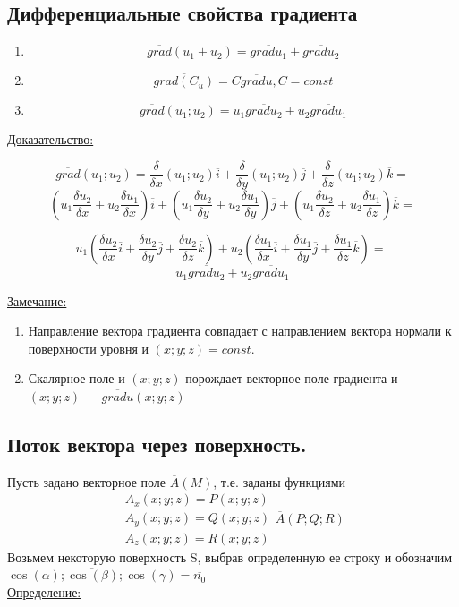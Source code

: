 \documentclass[12pt]{article}
\begin{document}
  \subsection*{Дифференциальные свойства градиента}
  \begin{enumerate}
    \item \[\overline{grad}(u_1+u_2)=\overline{grad u_1}+\overline{grad u_2}\]
    \item \[\overline{grad(C_u)}=C\overline{grad u}, C=const\]
    \item \[\overline{grad}(u_1;u_2)=u_1\overline{grad u_2}+u_2\overline{grad u_1}\]
  \end{enumerate}
  \underline{Доказательство:}
  \begin{adjustwidth}{1.5em}{1.5em}
    \[\overline{grad}(u_1;u_2)=
    \frac{\delta}{\delta x}(u_1;u_2)\overline{i}+\frac{\delta}{\delta y}(u_1;u_2)\overline{j}+\frac{\delta}{\delta z}(u_1;u_2)\overline{k}=\]\[
    (u_1 \frac{\delta u_2}{\delta x}+u_2\frac{\delta u_1}{\delta x})\overline{i} + (u_1 \frac{\delta u_2}{\delta y}+u_2\frac{\delta u_1}{\delta y})\overline{j} + (u_1\frac{\delta u_2}{\delta z}+u_2\frac{\delta u_1}{\delta z})\overline{k}=\]
  
    \[u_1(\frac{\delta u_2}{\delta x}\overline{i} +\frac{\delta u_2}{\delta y}\overline{j}+\frac{\delta u_2}{\delta z}\overline{k})+
  u_2(\frac{\delta u_1}{\delta x}\overline{i} +\frac{\delta u_1}{\delta y}\overline{j}+\frac{\delta u_1}{\delta z}\overline{k})=\
  \]\[u_1 \overline{grad u_2}+u_2 \overline{grad u_1}\]
  \end{adjustwidth}
  \underline{Замечание:}
  \begin{enumerate}
    \item Направление вектора градиента совпадает с направлением вектора нормали к поверхности уровня
    и $(x;y;z)=const.$
    \item Скалярное поле и $(x;y;z)$ порождает векторное поле градиента и $(x;y;z) \hspace{20pt} \overline{grad u}(x;y;z)$
  \end{enumerate}

  \subsection{Поток вектора через поверхность.}
  Пусть задано векторное поле $\overline{A}(M)$, т.е. заданы функциями
  \[\begin{matrix}
    A_x(x;y;z)=P(x;y;z)\\
    A_y(x;y;z)=Q(x;y;z)\\
    A_z(x;y;z)=R(x;y;z)
  \end{matrix} \overline{A}(P;Q;R)\]
  Возьмем некоторую поверхность S, выбрав определенную ее строку и обозначим $\overline{\cos(\alpha);\cos(\beta);\cos(\gamma)}=\overline{n_0}$\\
  \underline{Определение: }
\end{document}
